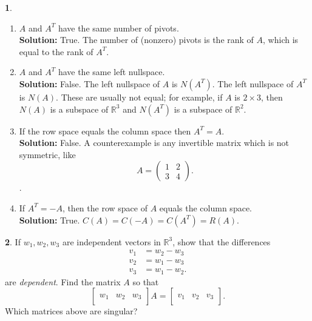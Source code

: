 \documentclass{article}
\theoremstyle{definition}
\newtheorem{prob}{}
\begin{document}
\begin{prob}
\begin{enumerate}
	\item $A$ and $A^T$ have the same number of pivots.\\ \textbf{Solution:} True. The number of (nonzero) pivots is the rank of $A$, which is equal to the rank of $A^T$.
	
	\item $A$ and $A^T$ have the same left nullspace. \\ \textbf{Solution:} False. The left nullspace of $A$ is $N(A^T)$. The left nullspace of $A^T$ is $N(A)$. These are usually not equal; for example, if $A$ is $2 \times 3$, then $N(A)$ is a subspace of $\mathbb{R}^3$ and $N(A^T)$ is a subspace of $\mathbb{R}^2$.
	
	\item If the row space equals the column space then $A^T=A$. \\ \textbf{Solution:} False. A counterexample is any invertible matrix which is not symmetric, like 
	\[A = \begin{pmatrix} 1 & 2 \\ 3 & 4 \end{pmatrix}. \].
	
	\item If $A^T = -A$, then the row space of $A$ equals the column space. \\ \textbf{Solution:} True. $C(A) = C(-A) = C(A^T) = R(A)$.
	
\end{enumerate}
	
\end{prob}


\begin{prob} If $w_1, w_2, w_3$ are independent vectors in $\mathbb{R}^3$, show that the differences 
\begin{align*}
	v_1 &= w_2 - w_3 \\
	v_2 &= w_1 - w_3 \\
	v_3 &= w_1 - w_2.
\end{align*}
are \emph{dependent}.  Find the matrix $A$ so that
\[ \begin{bmatrix} \\ w_1 & w_2 & w_3 \\ &\end{bmatrix}A = \begin{bmatrix} \\ v_1 & v_2 & v_3 \\ &\end{bmatrix}.\]
Which matrices above are singular?
\end{prob}
\end{document}

